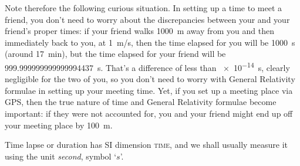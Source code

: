 \documentclass[a4paper,12pt,%
onecolumn,oneside,%
british%
]{memoir}
\renewcommand*{\|}[1][]{\nonscript\:#1\vert\nonscript\:\mathopen{}}
\newcommand*{\yc}{c} %
\begin{document}
Note therefore the following curious situation. In setting up a time to meet a friend, you don't need to worry about the discrepancies between your and your friend's proper times: if your friend walks \qty{1000}{m} away from you and then immediately back to you, at \qty{1}{m/s}, then the time elapsed for you will be \qty{1000}{s} (around \qty{17}{min}), but the time elapsed for your friend will be \qty{999.999999999999994437}{s}. That's a difference of less than \qty{e-14}{s}, clearly negligible for the two of you, so you don't need to worry with General Relativity formulae in setting up your meeting time. Yet, if you set up a meeting place via GPS, then the true nature of time and General Relativity formulae become important: if they were not accounted for, you and your friend might end up off your meeting place by \qty{100}{m}.

Time lapse or duration has SI dimension \textsc{time}, and we shall usually measure it using the unit \emph{second}, symbol \enquote*{$\unit{s}$}.

\end{document}
